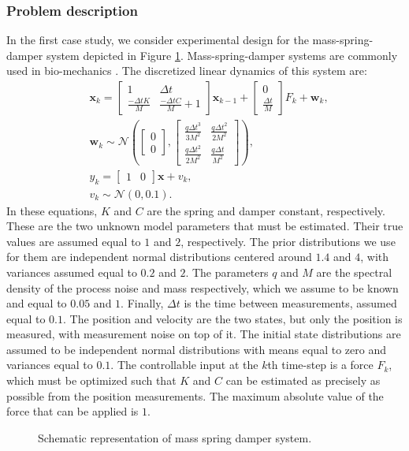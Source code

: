 \subsubsection{Problem description}
In the first case study, we consider experimental design for the mass-spring-damper system depicted in Figure \ref{fig:msd}. {\color{red}Mass-spring-damper systems are commonly used in bio-mechanics \parencite{pieczywek}.} The discretized linear dynamics of this system are:
\begin{equation}
\begin{aligned}
&\bm x_k = \begin{bmatrix}
1 & \Delta t\\
\frac{-\Delta tK}{M} & \frac{-\Delta tC}{M} + 1
\end{bmatrix} \bm x_{k-1} +
\begin{bmatrix} 0 \\ \frac{\Delta t}{M}\end{bmatrix} F_k + 
\bm w_k,\\
&\bm w_k \sim  \mathcal{N}\left(\begin{bmatrix}0\\0\end{bmatrix},
\begin{bmatrix}\frac{q\Delta t^3}{3M^2} & \frac{q\Delta t^2}{2M^2} \\\frac{q\Delta t^2}{2M^2}  & \frac{q \Delta t}{M^2} \end{bmatrix}\right),\\
&y_k = \begin{bmatrix} 1 & 0 \end{bmatrix} \bm x + v_k,\\
&v_k \sim \mathcal{N}(0,0.1).
\end{aligned}
\end{equation}
In these equations, $K$ and $C$ are the spring and damper constant, respectively. These are the two unknown model parameters that must be estimated. Their true values are assumed equal to $1$ and $2$, respectively. The prior distributions we use for them are independent normal distributions centered around $1.4$ and $4$, with variances assumed equal to $0.2$ and $2$. The parameters $q$ and $M$ are the spectral density of the process noise and mass respectively, which we assume to be known and equal to $0.05$ and $1$. Finally, $\Delta t$ is the time between measurements, assumed equal to $0.1$. The position and velocity are the two states, but only the position is measured, with measurement noise on top of it. The initial state distributions are assumed to be independent normal distributions with means equal to zero and variances equal to $0.1$. The controllable input at the $k$th time-step is a force $F_k$, which must be optimized such that $K$ and $C$ can be estimated as precisely as possible from the position measurements. The maximum absolute value of the force that can be applied is $1$.
\begin{figure}[H]
	\centering
	
	\caption{Schematic representation of mass spring damper system.} 
	\label{fig:msd}
\end{figure}
